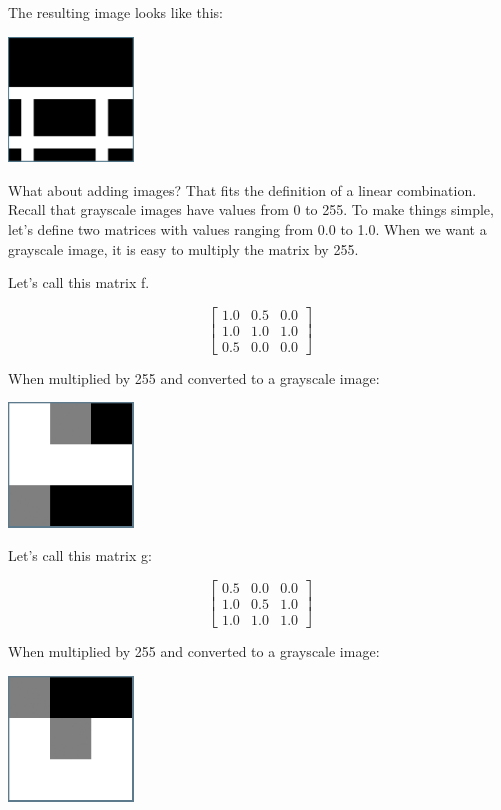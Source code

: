 The resulting image looks like this:

\includegraphics[width=0.25\textwidth]{transpose.png}

What about adding images? That fits the definition of a linear combination. Recall that grayscale images have values from 0 to 255. To make things simple, let's define two matrices with values ranging from 0.0 to 1.0. When we want a grayscale image, it is easy to multiply the matrix by 255. 

Let's call this matrix f.

$$\begin{bmatrix}
1.0 & 0.5 & 0.0\\
1.0 & 1.0 & 1.0\\
0.5 & 0.0 & 0.0 
\end{bmatrix}$$

When multiplied by 255 and converted to a grayscale image:

\includegraphics[width=0.25\textwidth]{fBitmap.png}

Let's call this matrix g:

$$\begin{bmatrix}
0.5 & 0.0 & 0.0\\
1.0 & 0.5 & 1.0\\
1.0 & 1.0 & 1.0 
\end{bmatrix}$$

When multiplied by 255 and converted to a grayscale image:

\includegraphics[width=0.25\textwidth]{gBitmap.png}

